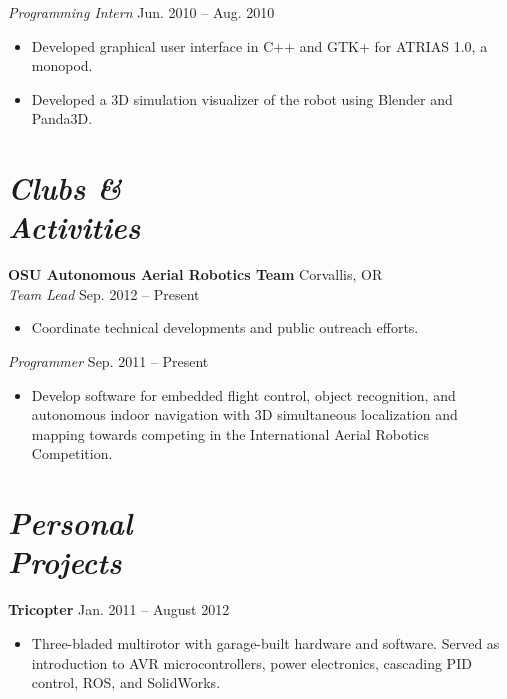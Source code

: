 \documentclass[10pt,letterpaper,margin]{res}
\begin{document}
\begin{resume}
{\it Programming Intern} \hfill {\color{lightgray} Jun. 2010 -- Aug. 2010}\vspace{0.2em}

\begin{itemize}
	\item Developed graphical user interface in C++ and GTK+ for ATRIAS 1.0,
		a monopod.
	\item Developed a 3D simulation visualizer of the robot using Blender and
		Panda3D.
\end{itemize}



\section{\large\itshape Clubs \& \\ Activities}

{\bf OSU Autonomous Aerial Robotics Team} \hfill {\color{lightgray} Corvallis, OR} \\
{\it Team Lead} \hfill {\color{lightgray} Sep. 2012 -- Present}\vspace{0.2em}

\begin{itemize}
	\item Coordinate technical developments and public outreach efforts.
\end{itemize}

{\it Programmer} \hfill {\color{lightgray} Sep. 2011 -- Present}\vspace{0.2em}

\begin{itemize}
	\item Develop software for embedded flight control, object recognition, and
		autonomous indoor navigation with 3D simultaneous localization and
		mapping towards competing in the International Aerial Robotics
		Competition.
\end{itemize}



\section{\large\itshape Personal \\ Projects}

{\bf Tricopter} \hfill {\color{lightgray} Jan. 2011 -- August 2012}\vspace{0.2em}

\begin{itemize}
	\item Three-bladed multirotor with garage-built hardware and software.
		Served as introduction to AVR microcontrollers, power electronics,
		cascading PID control, ROS, and SolidWorks.
\end{itemize}


\end{resume}
\end{document}
